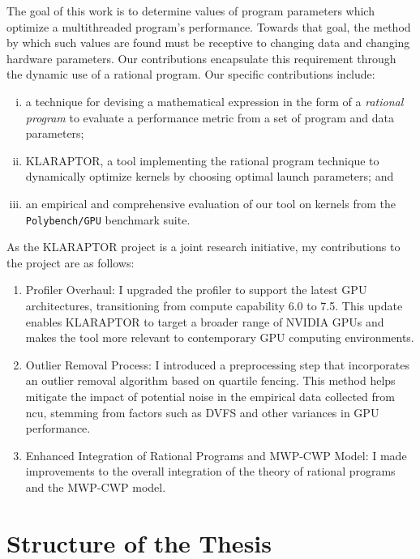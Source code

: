 The goal of this work is to determine values of program parameters which
optimize a multithreaded program's performance.  Towards that goal,
the method by which such values are found must be
receptive to changing data and changing  hardware parameters. Our contributions
encapsulate this requirement through the dynamic use of a rational
program.  Our specific contributions include:
\begin{enumerate}[(i)]
	\item a technique for devising a mathematical expression in the form of a {\em rational program} to evaluate a performance metric from a set of program and data parameters;
	\item KLARAPTOR, a tool implementing the rational program technique to dynamically optimize {\cuda} kernels by choosing optimal launch parameters; and
	\item an empirical and comprehensive evaluation of our tool on kernels from the \texttt{Polybench/GPU} benchmark suite.
\end{enumerate}

As the KLARAPTOR project is a joint research initiative, my contributions to the project are as follows:
\begin{enumerate}
	\item Profiler Overhaul: I upgraded the profiler to support the latest GPU architectures, 
    transitioning from compute capability 6.0 to 7.5. This update enables KLARAPTOR to target a broader 
    range of NVIDIA GPUs and makes the tool more relevant to contemporary GPU computing environments.

	\item Outlier Removal Process: I introduced a preprocessing step that incorporates an outlier 
    removal algorithm based on quartile fencing. This method helps mitigate the impact of potential noise 
    in the empirical data collected from ncu, stemming from factors such as DVFS and other variances in
    GPU performance.

	\item Enhanced Integration of Rational Programs and MWP-CWP Model: I made improvements to the 
    overall integration of the theory of rational programs and the MWP-CWP model.
\end{enumerate}


\section{Structure of the Thesis}
\label{sec:structure}

